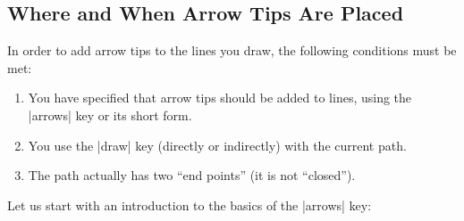\subsection{Where and When Arrow Tips Are Placed}

In order to add arrow tips to the lines you draw, the following
conditions must be met:

\begin{enumerate}
\item You have specified that arrow tips should be added to 
  lines, using the |arrows| key or its short form.
\item You use the |draw| key (directly or indirectly) with the current
  path. 
\item The path actually has two ``end points'' (it is not
  ``closed'').
\end{enumerate}

Let us start with an introduction to the basics of the |arrows| key: 

